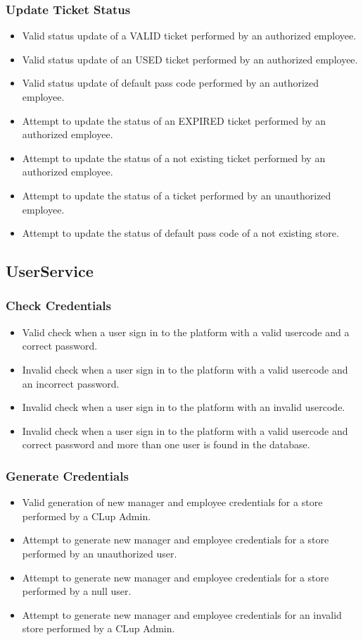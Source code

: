 \subsubsection{Update Ticket Status}
\begin{itemize}
	\item Valid status update of a VALID ticket performed by an authorized employee.
	\item Valid status update of an USED ticket performed by an authorized employee.
	\item Valid status update of default pass code performed by an authorized employee.
	\item Attempt to update the status of an EXPIRED ticket performed by an authorized employee.
	\item Attempt to update the status of a not existing ticket performed by an authorized employee.
	\item Attempt to update the status of a ticket performed by an unauthorized employee.
	\item Attempt to update the status of default pass code of a not existing store.
\end{itemize}

\subsection{UserService}
\subsubsection{Check Credentials}
\begin{itemize}
	\item Valid check when a user sign in to the platform with a valid usercode and a correct password.
	\item Invalid check when a user sign in to the platform with a valid usercode and an incorrect password.
	\item Invalid check when a user sign in to the platform with an invalid usercode.
	\item Invalid check when a user sign in to the platform with a valid usercode and correct password and more than one user is found in the database.
\end{itemize}

\subsubsection{Generate Credentials}
\begin{itemize}
	\item Valid generation of new manager and employee credentials for a store performed by a CLup Admin.
	\item Attempt to generate new manager and employee credentials for a store performed by an unauthorized user.
		\item Attempt to generate new manager and employee credentials for a store performed by a null user.
	\item Attempt to generate new manager and employee credentials for an invalid store performed by a CLup Admin.
\end{itemize}

